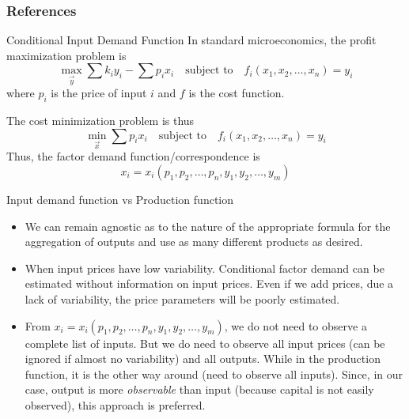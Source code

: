 \documentclass[10pt,mathserif,aspectratio=169]{beamer}
\begin{document}
\begin{frame}[allowframebreaks]
  \frametitle{References}
  
  
\end{frame}

\appendix

\begin{frame}[label=inputdemand]{Conditional Input Demand Function}
  In standard microeconomics, the profit maximization problem is
  \begin{equation*}
    \max_{\vec{y}} \sum k_i y_i - \sum p_i x_i \quad \text{subject to} \quad f_i(x_1, x_2, \ldots, x_n) = y_i
  \end{equation*}
  where $p_i$ is the price of input $i$ and $f$ is the cost function.

  The cost minimization problem is thus
  \begin{equation*}
    \min_{\vec{x}} \sum p_i x_i \quad \text{subject to} \quad f_i(x_1, x_2, \ldots, x_n) = y_i
  \end{equation*}
  Thus, the factor demand function/correspondence is
  \begin{equation*}
    x_i = x_i(p_1, p_2, \ldots, p_n, y_1, y_2, \ldots, y_m)
  \end{equation*}
  \hyperlink{literature}{}
\end{frame}

\begin{frame}[label=production]{Input demand function vs Production function}
  \begin{itemize}
    \item We can remain agnostic as to the nature of the appropriate formula for the
          aggregation of outputs and use as many different products as desired.
    \item When input prices have low variability. Conditional factor demand can be
          estimated without information on input prices. Even if we add prices, due a
          lack of variability, the price parameters will be poorly estimated.

    \item From $x_i = x_i(p_1, p_2, \ldots, p_n, y_1, y_2, \ldots, y_m)$, we do not need
          to observe a complete list of inputs. But we do need to observe all input
          prices (can be ignored if almost no variability) and all outputs. While in the
          production function, it is the other way around (need to observe all inputs).
          Since, in our case, output is more \textit{observable} than input (because
          capital is not easily observed), this approach is preferred.
  \end{itemize}
\end{frame}
\end{document}
